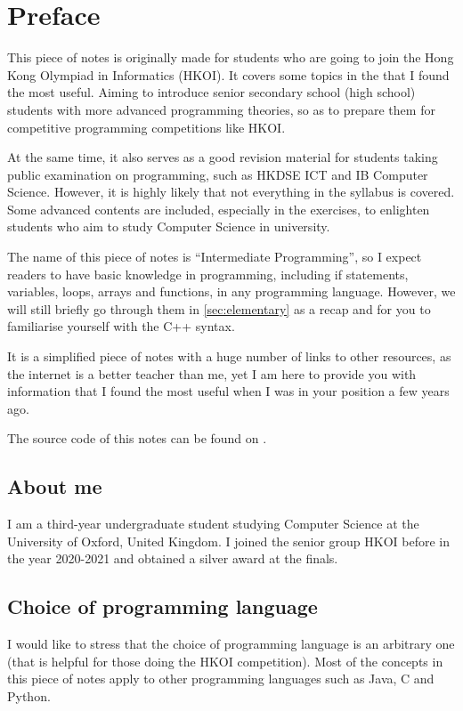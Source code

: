 \chapter*{Preface}

This piece of notes is originally made for students who are going to join the Hong Kong Olympiad in Informatics (HKOI). It covers some topics in the  that I found the most useful. Aiming to introduce senior secondary school (high school) students with more advanced programming theories, so as to prepare them for competitive programming competitions like HKOI. 

At the same time, it also serves as a good revision material for students taking public examination on programming, such as HKDSE ICT and IB Computer Science. However, it is highly likely that not everything in the syllabus is covered. Some advanced contents are included, especially in the exercises, to enlighten students who aim to study Computer Science in university. 

The name of this piece of notes is ``Intermediate Programming'', so I expect readers to have basic knowledge in programming, including if statements, variables, loops, arrays and functions, in any programming language. However, we will still briefly go through them in \cref{sec:elementary} as a recap and for you to familiarise yourself with the C++ syntax.

It is a simplified piece of notes with a huge number of links to other resources, as the internet is a better teacher than me, yet I am here to provide you with information that I found the most useful when I was in your position a few years ago.

The source code of this notes can be found on .

\section*{About me}

I am a third-year undergraduate student studying Computer Science at the University of Oxford, United Kingdom. I joined the senior group HKOI before in the year 2020-2021 and obtained a silver award at the finals. 

\section*{Choice of programming language}
I would like to stress that the choice of programming language is an arbitrary one (that is helpful for those doing the HKOI competition). Most of the concepts in this piece of notes apply to other programming languages such as Java, C and Python.

